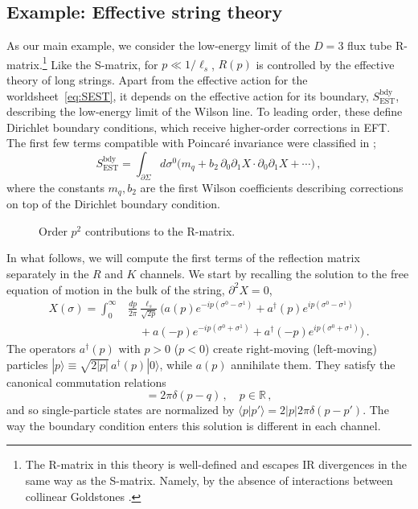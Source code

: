 \documentclass[
 reprint,
 amsmath,
 pre,
 amssymb,
 nofootinbib,
 aps,
 longbibliography,
]{revtex4-1}
\newcommand{\<}{{\langle}}
\renewcommand{\>}{{\rangle}}
\begin{document}
\subsection{Example: Effective string theory}\label{app:EST}
As our main example, we consider the low-energy limit of the $D=3$ flux tube R-matrix.\footnote{The R-matrix in this theory is well-defined and escapes IR divergences in the same way as the S-matrix. Namely, by the absence of interactions between collinear Goldstones \cite{Dubovsky:2012wk}.}  Like the S-matrix, for ${p\ll 1/\ell_s}$, $R(p)$ is controlled by the effective theory of long strings. Apart from the effective action for the worldsheet~\eqref{eq:SEST}, it depends on the effective action for its boundary, $S_{\text{EST}}^{\text{bdy}}$, describing the low-energy limit of the Wilson line.
To leading order, these define Dirichlet boundary conditions, which receive higher-order corrections in EFT.
The first few terms compatible with Poincar\'e invariance were classified in \cite{Aharony:2010cx};
\begin{equation}\label{eq:S-bdy}
    S_{\text{EST}}^{\text{bdy}} = \int_{\partial \Sigma} d\sigma^0 \Big(m_q + b_2\, \partial_0 \partial_1 X\cdot \partial_0 \partial_1 X + \cdots\Big)\,,
\end{equation}
where the constants $m_q, b_2$ are the first Wilson coefficients describing corrections on top of the Dirichlet boundary condition.

\begin{figure}[t]
\centering
{}
\caption{Order $p^2$ contributions to the R-matrix.}
\label{fig:R-loop}
\end{figure}

In what follows, we will compute the first terms of the reflection matrix separately in the $R$ and $K$ channels. We start by recalling the solution to the free equation of motion in the bulk of the string, $\partial^2 X=0$,
\begin{align}\label{eq:Xsol}
    X(\sigma) = \int_{0}^\infty &\frac{dp}{2\pi} \frac{\ell_s}{\sqrt{2p}} \bigg(a(p)e^{-ip(\sigma^0-\sigma^1)} + a^\dagger(p) e^{ip(\sigma^0-\sigma^1)}\nonumber\\
    &\quad + a(-p)e^{-ip(\sigma^0+\sigma^1)} + a^\dagger(-p) e^{ip(\sigma^0+\sigma^1)} \bigg)\,.
\end{align}
The operators $a^\dagger(p)$ with $p>0$ ($p<0$) create right-moving (left-moving) particles $|p\rangle \equiv \sqrt{2|p|} \, a^\dagger(p)|0\rangle$, while $a(p)$ annihilate them. They satisfy the canonical commutation relations
\begin{equation}
    [a(p), a^\dagger (q)] = 2\pi \delta(p-q)\,, \quad p\in \mathbb R\,,
\end{equation}
and so single-particle states are normalized by $\langle p| p'\rangle = 2|p| 2\pi \delta(p-p')$. The way the boundary condition enters this solution is different in each channel.
\end{document}
